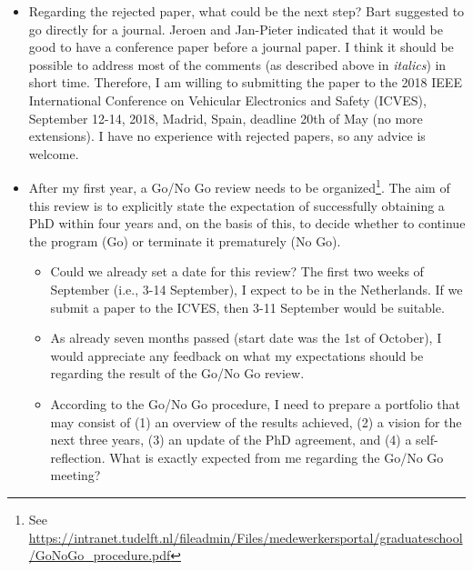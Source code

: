 \documentclass[10pt,final,a4paper,oneside,onecolumn]{article}
\begin{document}
\begin{itemize}
	\item Regarding the rejected paper, what could be the next step? Bart suggested to go directly for a journal. Jeroen and Jan-Pieter indicated that it would be good to have a conference paper before a journal paper. I think it should be possible to address most of the comments (as described above in \textit{italics}) in short time. Therefore, I am willing to submitting the paper to the 2018 IEEE International Conference on Vehicular Electronics and Safety (ICVES), September 12-14, 2018, Madrid, Spain, deadline 20th of May (no more extensions). I have no experience with rejected papers, so any advice is welcome.
	\item After my first year, a Go/No Go review needs to be organized\footnote{See \url{https://intranet.tudelft.nl/fileadmin/Files/medewerkersportal/graduateschool/GoNoGo_procedure.pdf}}. The aim of this review is to explicitly state the expectation of successfully obtaining a PhD within four years and, on the basis of this, to decide whether to continue the program (Go) or terminate it prematurely (No Go).
	\begin{itemize}
		\item Could we already set a date for this review? The first two weeks of September (i.e., 3-14 September), I expect to be in the Netherlands. If we submit a paper to the ICVES, then 3-11 September would be suitable.
		\item As already seven months passed (start date was the 1st of October), I would appreciate any feedback on what my expectations should be regarding the result of the Go/No Go review.
		\item According to the Go/No Go procedure, I need to prepare a portfolio that may consist of (1) an overview of the results achieved, (2) a vision for the next three years, (3) an update of the PhD agreement, and (4) a self-reflection. What is exactly expected from me regarding the Go/No Go meeting?
	\end{itemize}
\end{itemize}


\printbibliography
\end{document}
